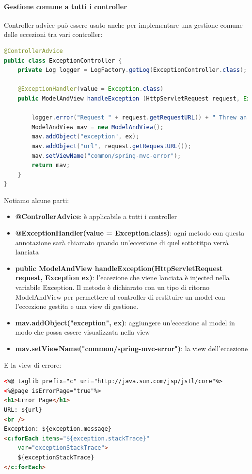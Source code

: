\documentclass[11pt,a4paper]{book}
\begin{document}
\paragraph{Gestione comune a tutti i controller}
Controller advice può essere usato anche per implementare una gestione comune delle eccezioni tra vari controller:
\begin{lstlisting}[language = Java]
@ControllerAdvice
public class ExceptionController {
	private Log logger = LogFactory.getLog(ExceptionController.class);
	
	@ExceptionHandler(value = Exception.class)
	public ModelAndView handleException	(HttpServletRequest request, Exception ex) {
		
		logger.error("Request " + request.getRequestURL() + " Threw an Exception", ex);
		ModelAndView mav = new ModelAndView();
		mav.addObject("exception", ex);
		mav.addObject("url", request.getRequestURL());
		mav.setViewName("common/spring-mvc-error");
		return mav;
	}
}
\end{lstlisting}
Notiamo alcune parti:
\begin{itemize}
	\item \textbf{@ControllerAdvice}: è applicabile a tutti i controller
	\item \textbf{@ExceptionHandler(value = Exception.class)}: ogni metodo con questa annotazione sarà chiamato quando un'eccezione di quel sottotitpo verrà lanciata
	\item \textbf{public ModelAndView handleException(HttpServletRequest request, Exception ex)}: l'eccezione che viene lanciata è injected nella variabile Exception. Il metodo è dichiarato con un tipo di ritorno ModelAndView per permettere al controller di restituire un model con l'eccezione gestita e una view di gestione.
	\item\textbf{ mav.addObject("exception", ex)}: aggiungere un'eccezione al model in modo che possa essere visualizzata nella view
	\item \textbf{mav.setViewName("common/spring-mvc-error")}: la view dell'eccezione
\end{itemize}

E la view di errore:
\begin{lstlisting}[language = HTML]
<%@ taglib prefix="c" uri="http://java.sun.com/jsp/jstl/core"%>
<%@page isErrorPage="true"%>
<h1>Error Page</h1>
URL: ${url}
<br />
Exception: ${exception.message}
<c:forEach items="${exception.stackTrace}"
	var="exceptionStackTrace">
	${exceptionStackTrace}
</c:forEach>
\end{lstlisting}
\end{document}
